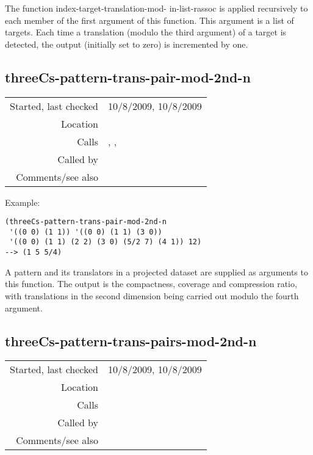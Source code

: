 \noindent The function index-target-translation-mod-
in-list-rassoc is applied recursively to each member
of the first argument of this function. This argument
is a list of targets. Each time a translation (modulo
the third argument) of a target is detected, the
output (initially set to zero) is incremented by
one.


\subsection*{threeCs-pattern-trans-pair-mod-2nd-n}\label{fun:threeCs-pattern-trans-pair-mod-2nd-n}

\vspace{0.3cm}
\begin{tabular}{r|p{8cm}}
Started, last checked & 10/8/2009, 10/8/2009 \\
Location & \nameref{sec:evaluation-for-SIA+} \\
Calls & \nameref{fun:coverage-mod-2nd-n}, \nameref{fun:index-item-1st-occurs},\newline \nameref{fun:my-last} \\
Called by & \nameref{fun:threeCs-pattern-trans-pairs-mod-2nd-n} \\
Comments/see also &
\end{tabular}

\vspace{0.5cm}
\noindent Example:
\begin{verbatim}
(threeCs-pattern-trans-pair-mod-2nd-n
 '((0 0) (1 1)) '((0 0) (1 1) (3 0))
 '((0 0) (1 1) (2 2) (3 0) (5/2 7) (4 1)) 12)
--> (1 5 5/4)
\end{verbatim}

\noindent A pattern and its translators in a projected
dataset are supplied as arguments to this function.
The output is the compactness, coverage and
compression ratio, with translations in the second
dimension being carried out modulo the fourth
argument.


\subsection*{threeCs-pattern-trans-pairs-mod-2nd-n}\label{fun:threeCs-pattern-trans-pairs-mod-2nd-n}

\vspace{0.3cm}
\begin{tabular}{r|p{8cm}}
Started, last checked & 10/8/2009, 10/8/2009 \\
Location & \nameref{sec:evaluation-for-SIA+} \\
Calls & \nameref{fun:threeCs-pattern-trans-pair-mod-2nd-n} \\
Called by & \\
Comments/see also &
\end{tabular}

